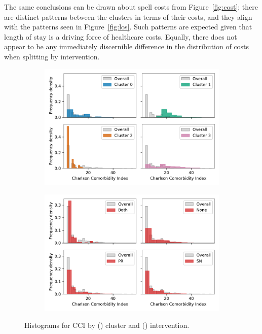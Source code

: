 \documentclass[11pt]{article}
\newlength{\imgwidth}
\begin{document}
The same conclusions can be drawn about spell costs from Figure~\ref{fig:cost};
there are distinct patterns between the clusters in terms of their costs, and
they align with the patterns seen in Figure~\ref{fig:los}. Such patterns are
expected given that length of stay is a driving force of healthcare costs.
Equally, there does not appear to be any immediately discernible difference in
the distribution of costs when splitting by intervention.

\begin{figure}
    \centering
    \begin{subfigure}{.5\imgwidth}
        \includegraphics[width=\linewidth]{img_cluster_charlson_gross}
        \caption{}\label{fig:cluster_charlson}
    \end{subfigure}\hfill%
    \begin{subfigure}{.5\imgwidth}
        \includegraphics[width=\linewidth]{img_intervention_charlson_gross}
        \caption{}\label{fig:intervention_charlson}
    \end{subfigure}
    \caption{%
        Histograms for CCI by () cluster and
        () intervention.
    }\label{fig:charlson}
\end{figure}
\end{document}

